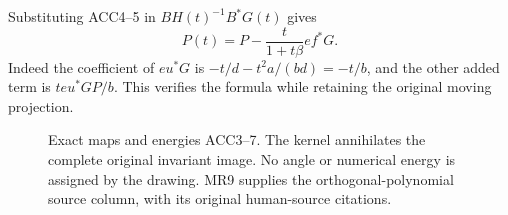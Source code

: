 \documentclass[11pt]{article}
\begin{document}
Substituting ACC4--5 in \(BH(t)^{-1}B^*G(t)\) gives
\begin{equation}\tag{ACC8}
\boxed{P(t)=P-\frac{t}{1+t\beta}e f^*G.}
\end{equation}
Indeed the coefficient of \(e u^*G\) is
\(-t/d-t^2a/(bd)=-t/b\), and the other added term is
\(t e u^*GP/b\). This verifies the formula while retaining
the original moving projection.

\begin{figure}[ht]\centering
{}
\caption{Exact maps and energies ACC3--7. The kernel annihilates the
complete original invariant image. No angle or numerical energy is
assigned by the drawing. MR9 supplies the orthogonal-polynomial
source column, with its original human-source citations.}
\end{figure}
\end{document}
